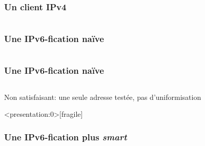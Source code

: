 
\begin{frame}[fragile]{}
	\frametitle{Un client IPv4}
    \begin{minipage}{0.5\textwidth}
      \inputminted[mathescape,
        linenos,
        fontsize=\scriptsize,
        framesep=2mm]{python}{../echo_client_v4.py}
    \end{minipage}
	
\end{frame}

\begin{frame}[fragile]{}
	\frametitle{Une IPv6-fication naïve}
    \begin{minipage}{0.5\textwidth}
      \inputminted[mathescape,
        fontsize=\scriptsize,
        framesep=2mm]{diff}{../echo_client_v4_v6.diff}
    \end{minipage}
\end{frame}


\begin{frame}[fragile]{}
	\frametitle{Une IPv6-fication naïve}
    \begin{minipage}{\textwidth}
      \inputminted[mathescape,
        linenos,
        fontsize=\scriptsize,
        framesep=2mm]{python}{../echo_client_v6_naif.py}
		Non satisfaisant: une seule adresse testée, pas d'uniformisation
    \end{minipage}
\end{frame}

\begin{frame}<presentation:0>[fragile]{}
	\frametitle{Une IPv6-fication plus \emph{smart}}
    \begin{minipage}{0.5\textwidth}
      \inputminted[mathescape,
        fontsize=\scriptsize,
        framesep=2mm]{diff}{../echo_client_v6_naif_v6.diff}
    \end{minipage}
\end{frame}


